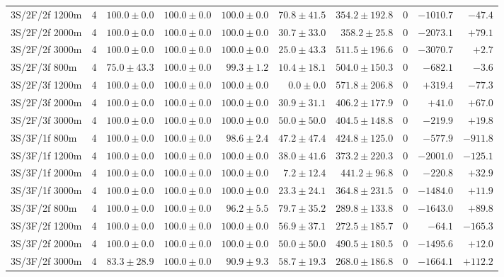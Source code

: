 \begin{tabular}{l r r r r r r r r r}
3S/2F/2f 1200m & 4 & $100.0 \pm 0.0$ & $100.0 \pm 0.0$ & $100.0 \pm 0.0$ & $70.8 \pm 41.5$ & $354.2 \pm 192.8$ & $0$ & $-1010.7$ & $-47.4$ \\
3S/2F/2f 2000m & 4 & $100.0 \pm 0.0$ & $100.0 \pm 0.0$ & $100.0 \pm 0.0$ & $30.7 \pm 33.0$ & $358.2 \pm 25.8$ & $0$ & $-2073.1$ & $+79.1$ \\
3S/2F/2f 3000m & 4 & $100.0 \pm 0.0$ & $100.0 \pm 0.0$ & $100.0 \pm 0.0$ & $25.0 \pm 43.3$ & $511.5 \pm 196.6$ & $0$ & $-3070.7$ & $+2.7$ \\
3S/2F/3f 800m & 4 & $75.0 \pm 43.3$ & $100.0 \pm 0.0$ & $99.3 \pm 1.2$ & $10.4 \pm 18.1$ & $504.0 \pm 150.3$ & $0$ & $-682.1$ & $-3.6$ \\
3S/2F/3f 1200m & 4 & $100.0 \pm 0.0$ & $100.0 \pm 0.0$ & $100.0 \pm 0.0$ & $0.0 \pm 0.0$ & $571.8 \pm 206.8$ & $0$ & $+319.4$ & $-77.3$ \\
3S/2F/3f 2000m & 4 & $100.0 \pm 0.0$ & $100.0 \pm 0.0$ & $100.0 \pm 0.0$ & $30.9 \pm 31.1$ & $406.2 \pm 177.9$ & $0$ & $+41.0$ & $+67.0$ \\
3S/2F/3f 3000m & 4 & $100.0 \pm 0.0$ & $100.0 \pm 0.0$ & $100.0 \pm 0.0$ & $50.0 \pm 50.0$ & $404.5 \pm 148.8$ & $0$ & $-219.9$ & $+19.8$ \\
3S/3F/1f 800m & 4 & $100.0 \pm 0.0$ & $100.0 \pm 0.0$ & $98.6 \pm 2.4$ & $47.2 \pm 47.4$ & $424.8 \pm 125.0$ & $0$ & $-577.9$ & $-911.8$ \\
3S/3F/1f 1200m & 4 & $100.0 \pm 0.0$ & $100.0 \pm 0.0$ & $100.0 \pm 0.0$ & $38.0 \pm 41.6$ & $373.2 \pm 220.3$ & $0$ & $-2001.0$ & $-125.1$ \\
3S/3F/1f 2000m & 4 & $100.0 \pm 0.0$ & $100.0 \pm 0.0$ & $100.0 \pm 0.0$ & $7.2 \pm 12.4$ & $441.2 \pm 96.8$ & $0$ & $-220.8$ & $+32.9$ \\
3S/3F/1f 3000m & 4 & $100.0 \pm 0.0$ & $100.0 \pm 0.0$ & $100.0 \pm 0.0$ & $23.3 \pm 24.1$ & $364.8 \pm 231.5$ & $0$ & $-1484.0$ & $+11.9$ \\
3S/3F/2f 800m & 4 & $100.0 \pm 0.0$ & $100.0 \pm 0.0$ & $96.2 \pm 5.5$ & $79.7 \pm 35.2$ & $289.8 \pm 133.8$ & $0$ & $-1643.0$ & $+89.8$ \\
3S/3F/2f 1200m & 4 & $100.0 \pm 0.0$ & $100.0 \pm 0.0$ & $100.0 \pm 0.0$ & $56.9 \pm 37.1$ & $272.5 \pm 185.7$ & $0$ & $-64.1$ & $-165.3$ \\
3S/3F/2f 2000m & 4 & $100.0 \pm 0.0$ & $100.0 \pm 0.0$ & $100.0 \pm 0.0$ & $50.0 \pm 50.0$ & $490.5 \pm 180.5$ & $0$ & $-1495.6$ & $+12.0$ \\
3S/3F/2f 3000m & 4 & $83.3 \pm 28.9$ & $100.0 \pm 0.0$ & $90.9 \pm 9.3$ & $58.7 \pm 19.3$ & $268.0 \pm 186.8$ & $0$ & $-1664.1$ & $+112.2$ \\

\end{tabular}
